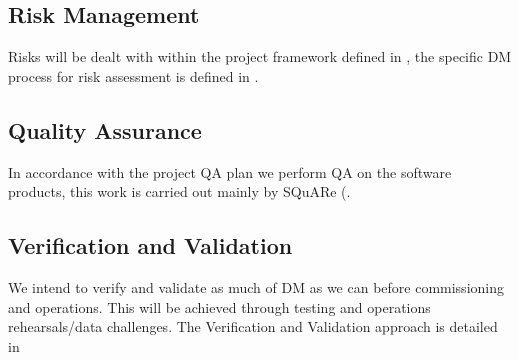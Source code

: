 \subsection {Risk Management } \label{sect:risk}

Risks will be dealt with within the project framework defined in , the specific DM process for risk assessment is defined in .


\subsection {Quality Assurance  } \label{sect:pa}
In accordance with the project QA plan  we perform QA on the software products, this work is carried out mainly by SQuARe (.

\subsection {Verification and Validation } \label{sect:vanv}
We intend to verify and validate as much of DM as we can before commissioning and operations. This will be achieved through testing and
operations rehearsals/data challenges. The Verification and Validation approach is detailed in \citeyearpar{LDM-503}
